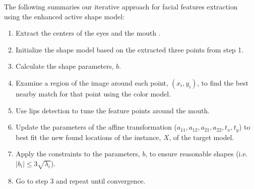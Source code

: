 The following summaries our iterative approach for facial features
extraction using the enhanced active shape model:
\begin{table}
\begin{enumerate}
\item Extract the centers of the eyes and the mouth \cite{Mottaleb02}.
\item Initialize the shape model based on the extracted three points from step
1.
\item Calculate the shape parameters, $b$.
\item Examine a region of the image around each point, $(x_i, y_i)$, to
find the best nearby match for that point using the color model.
\item Use lips detection to tune the feature points around the
mouth.
\item Update the parameters of the affine transformation
($a_{11}, a_{12}, a_{21}, a_{22}, t_x, t_y$) to best fit the new
found locations of the instance, $X$, of the target model.
\item Apply the constraints to the parameters, $b$, to ensure reasonable
shapes (i.e. $|b_i| \le 3\sqrt{\lambda_i}$).
\item Go to step 3 and repeat until convergence.
\end{enumerate}
\end{table}
